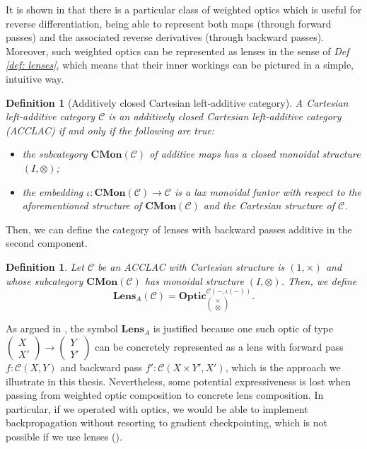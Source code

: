 \documentclass[11pt,a4paper,openright,twoside]{report}
\newcounter{mycounter}
\theoremstyle{plain}
\newtheorem{definition}[mycounter]{Definition}
\theoremstyle{definition}
\begin{document}
It is shown in \cite{gavranovic2024fundamental} that there is a particular class of weighted optics which is useful for reverse differentiation, being able to represent both maps (through forward passes) and the associated reverse derivatives (through backward passes). Moreover, such weighted optics can be represented as lenses in the sense of \textit{Def \ref{def: lenses}}, which means that their inner workings can be pictured in a simple, intuitive way.


\begin{definition}[Additively closed Cartesian left-additive category]
  A Cartesian left-additive category $\mathcal{C}$ is an additively closed Cartesian left-additive category (ACCLAC) if and only if the following are true:
  \begin{itemize}
    \item the subcategory $\mathbf{CMon}(\mathcal{C})$ of additive maps has a closed monoidal structure $(I, \otimes)$;
    \item the embedding $\iota: \mathbf{CMon}(\mathcal{C}) \to \mathcal{C}$ is a lax monoidal funtor with respect to the aforementioned structure of $\mathbf{CMon}(\mathcal{C})$ and the Cartesian structure of $\mathcal{C}$.
  \end{itemize}
\end{definition}


Then, we can define the category of lenses with backward passes additive in the second component.

\begin{definition}
  Let $\mathcal{C}$ be an ACCLAC with Cartesian structure is $(1, \times)$ and whose subcategory $\mathbf{CMon}(\mathcal{C})$ has monoidal structure $(I, \otimes)$. Then, we define
  \[\mathbf{Lens}_A(\mathcal{C}) = \mathbf{Optic}_{\left(\begin{smallmatrix}\times \\ \otimes\end{smallmatrix}\right)}^{\mathcal{C}(-,\iota(-))}.\]
\end{definition}

As argued in \cite{gavranovic2024fundamental}, the symbol $\mathbf{Lens}_A$ is justified because one such optic of type $\left(\begin{smallmatrix}X \\ X'\end{smallmatrix}\right) \to \left(\begin{smallmatrix}Y \\ Y'\end{smallmatrix}\right)$ can be concretely represented as a lens with forward pass $f : \mathcal{C}(X,Y)$ and backward pass $f' : \mathcal{C}(X \times Y',X')$, which is the approach we illustrate in this thesis.  Nevertheless, some potential expressiveness is lost when passing from weighted optic composition to concrete lens composition. In particular, if we operated with optics, we would be able to implement backpropagation without resorting to gradient checkpointing, which is not possible if we use lenses (\cite{gavranovic2024fundamental}). 
\end{document}
